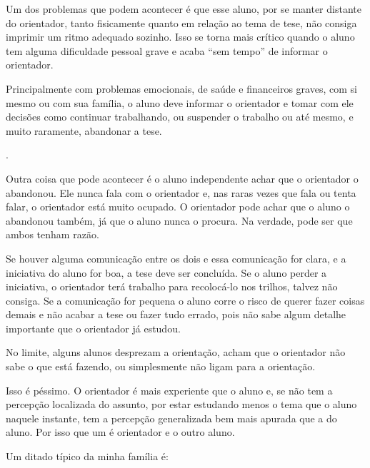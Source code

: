 Um dos problemas que podem acontecer é que esse aluno, por se manter distante do orientador, tanto fisicamente quanto em relação ao tema de tese, não consiga imprimir um ritmo adequado sozinho. Isso se torna mais crítico quando o aluno tem alguma dificuldade pessoal grave e acaba “sem tempo” de informar o orientador.



Principalmente com problemas emocionais, de saúde e financeiros graves, com si mesmo ou com sua família, o aluno deve informar o orientador e tomar com ele decisões como continuar trabalhando, ou suspender o trabalho ou até mesmo, e muito raramente, abandonar a tese. 

.


Outra coisa que pode acontecer é o aluno independente achar que o orientador o abandonou. Ele nunca fala com o orientador e, nas raras vezes que fala ou tenta falar, o orientador está muito ocupado. O orientador pode achar que o aluno o abandonou também, já que o aluno nunca o procura. Na verdade, pode ser que ambos tenham razão. 


Se houver alguma comunicação entre os dois e essa comunicação for clara, e a iniciativa do aluno for boa, a tese deve ser concluída. Se o aluno perder a iniciativa, o orientador terá trabalho para recolocá-lo nos trilhos, talvez não consiga. Se a comunicação for pequena o aluno corre o risco de querer fazer coisas demais e não acabar a tese ou fazer tudo errado, pois não sabe algum detalhe importante que o orientador já estudou.


No limite, alguns alunos desprezam a orientação, acham que o orientador não sabe o que está fazendo, ou simplesmente não ligam para a orientação.


Isso é péssimo. O orientador é mais experiente que o aluno e, se não tem a percepção localizada do assunto, por estar estudando menos o tema que o aluno naquele instante, tem a percepção generalizada bem mais apurada que a do aluno. Por isso que um é orientador e o outro aluno.


Um ditado típico da minha família é:




